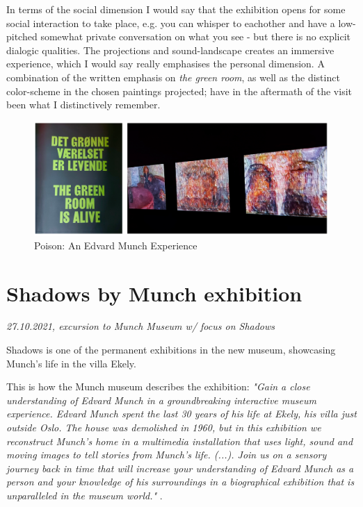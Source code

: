 In terms of the social dimension I would say that the exhibition opens for some social interaction to take place, e.g. you can whisper to eachother and have a low-pitched somewhat private conversation on what you see - but there is no explicit dialogic qualities. The projections and sound-landscape creates an immersive experience, which I would say really emphasises the personal dimension. A combination of the written emphasis on \emph{the green room}, as well as the distinct color-scheme in the chosen paintings projected; have in the aftermath of the visit been what I distinctively remember. 

\begin{figure}[H]
\includegraphics[width=12.5cm]{pictures/process/poison_alive.png}
\caption{Poison: An Edvard Munch Experience}
\centering 
\end{figure}


\section{Shadows by Munch exhibition}
\par
\emph{27.10.2021, excursion to Munch Museum w/ focus on Shadows}
\par

Shadows is one of the permanent exhibitions in the new museum, showcasing Munch's life in the villa Ekely.

This is how the Munch museum describes the exhibition: \emph{"Gain a close understanding of Edvard Munch in a groundbreaking interactive museum experience.
Edvard Munch spent the last 30 years of his life at Ekely, his villa just outside Oslo. The house was demolished in 1960, but in this exhibition we reconstruct Munch’s home in a multimedia installation that uses light, sound and moving images to tell stories from Munch’s life. (...). Join us on a sensory journey back in time that will increase your understanding of Edvard Munch as a person and your knowledge of his surroundings in a biographical exhibition that is unparalleled in the museum world."} \autocite{munch_shadows_web}.


